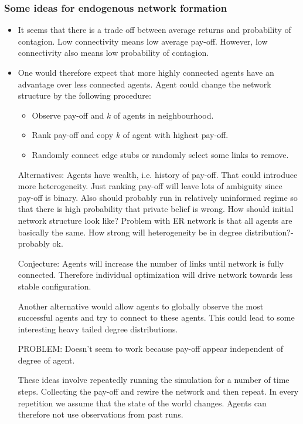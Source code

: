 \documentclass[10pt,a4paper]{article}
\begin{document}
\subsubsection*{Some ideas for endogenous network formation}
\begin{itemize}
\item It seems that there is a trade off between average returns and probability of contagion. Low connectivity means low average pay-off. However, low connectivity also means low probability of contagion. 
\item One would therefore expect that more highly connected agents have an advantage over less connected agents. Agent could change the network structure by the following procedure:
\begin{itemize}
\item Observe pay-off and $k$ of agents in neighbourhood.
\item Rank pay-off and copy $k$ of agent with highest pay-off.
\item Randomly connect edge stubs or randomly select some links to remove.
\end{itemize}
Alternatives: Agents have wealth, i.e. history of pay-off. That could introduce more heterogeneity. Just ranking pay-off will leave lots of ambiguity since pay-off is binary. Also should probably run in relatively uninformed regime so that there is high probability that private belief is wrong. How should initial network structure look like? Problem with ER network is that all agents are basically the same. How strong will heterogeneity be in degree distribution?- probably ok.

Conjecture: Agents will increase the number of links until network is fully connected. Therefore individual optimization will drive network towards less stable configuration.

Another alternative would allow agents to globally observe the most successful agents and try to connect to these agents. This could lead to some interesting heavy tailed degree distributions.

PROBLEM: Doesn't seem to work because pay-off appear independent of degree of agent.

These ideas involve repeatedly running the simulation for a number of time steps. Collecting the pay-off and rewire the network and then repeat. In every repetition we assume that the state of the world changes. Agents can therefore not use observations from past runs.
\end{itemize}
\end{document}
